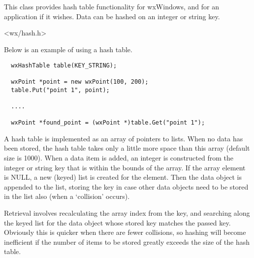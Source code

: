 \section{}\label{wxhashtable}

This class provides hash table functionality for wxWindows, and for an
application if it wishes.  Data can be hashed on an integer or string
key.




<wx/hash.h>


Below is an example of using a hash table.

\begin{verbatim}
  wxHashTable table(KEY_STRING);

  wxPoint *point = new wxPoint(100, 200);
  table.Put("point 1", point);

  ....

  wxPoint *found_point = (wxPoint *)table.Get("point 1");
\end{verbatim}

A hash table is implemented as an array of pointers to lists. When no
data has been stored, the hash table takes only a little more space than
this array (default size is 1000).  When a data item is added, an
integer is constructed from the integer or string key that is within the
bounds of the array. If the array element is NULL, a new (keyed) list is
created for the element. Then the data object is appended to the list,
storing the key in case other data objects need to be stored in the list
also (when a `collision' occurs).

Retrieval involves recalculating the array index from the key, and searching
along the keyed list for the data object whose stored key matches the passed
key. Obviously this is quicker when there are fewer collisions, so hashing
will become inefficient if the number of items to be stored greatly exceeds
the size of the hash table.







